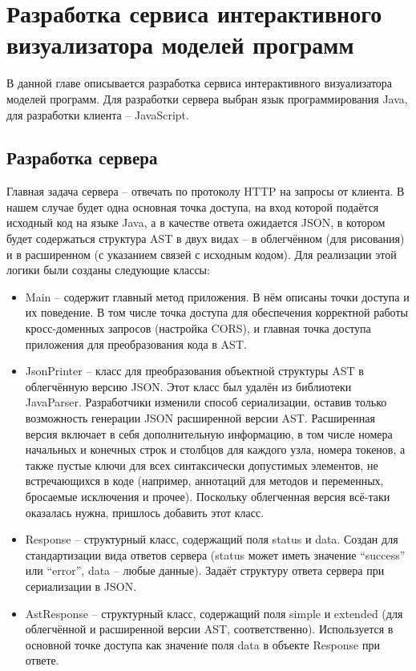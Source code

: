 \chapter{Разработка сервиса интерактивного визуализатора моделей программ} \label{ch5}
В данной главе описывается разработка сервиса интерактивного визуализатора моделей программ. Для разработки сервера выбран язык программирования Java, для разработки клиента – JavaScript.
\section{Разработка сервера} \label{ch5:sec1}
Главная задача сервера – отвечать по протоколу HTTP на запросы от клиента. В нашем случае будет одна основная точка доступа, на вход которой подаётся исходный код на языке Java, а в качестве ответа ожидается JSON, в котором будет содержаться структура AST в двух видах – в облегчённом (для рисования) и в расширенном (с указанием связей с исходным кодом).
Для реализации этой логики были созданы следующие классы:
\begin{itemize}
\item Main – содержит главный метод приложения. В нём описаны точки доступа и их поведение. В том числе точка доступа для обеспечения корректной работы кросс-доменных запросов (настройка CORS), и главная точка доступа приложения для преобразования кода в AST.
\item JsonPrinter – класс для преобразования объектной структуры AST в облегчённую версию JSON. Этот класс был удалён из библиотеки JavaParser. Разработчики изменили способ сериализации, оставив только возможность генерации JSON расширенной версии AST. Расширенная версия включает в себя дополнительную информацию, в том числе номера начальных и конечных строк и столбцов для каждого узла, номера токенов, а также пустые ключи для всех синтаксически допустимых элементов, не встречающихся в коде (например, аннотаций для методов и переменных, бросаемые исключения и прочее). Поскольку облегченная версия всё-таки оказалась нужна, пришлось добавить этот класс.
\item Response – структурный класс, содержащий поля status и data. Создан для стандартизации вида ответов сервера (status может иметь значение “success” или “error”, data – любые данные). Задаёт структуру ответа сервера при сериализации в JSON.
\item AstResponse – структурный класс, содержащий поля simple и extended (для облегчённой и расширенной версии AST, соответственно). Используется в основной точке доступа как значение поля data в объекте Response при ответе.
\end{itemize}
